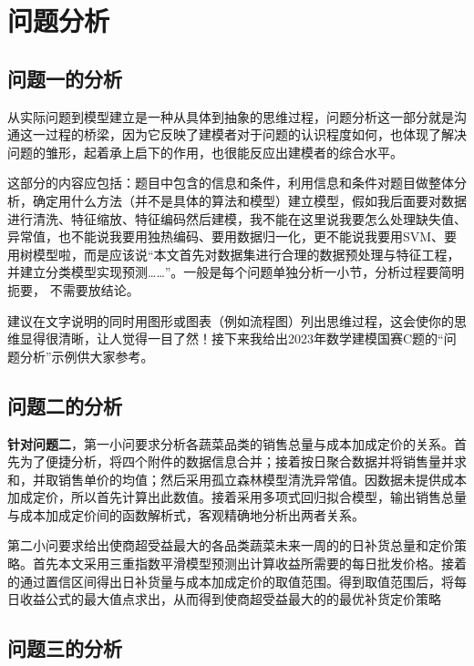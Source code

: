 \section{问题分析}

\subsection{问题一的分析}

从实际问题到模型建立是一种从具体到抽象的思维过程，问题分析这一部分就是沟通这一过程的桥梁，因为它反映了建模者对于问题的认识程度如何，也体现了解决问题的雏形，起着承上启下的作用，也很能反应出建模者的综合水平。

这部分的内容应包括：题目中包含的信息和条件，利用信息和条件对题目做整体分析，确定用什么方法（并不是具体的算法和模型）建立模型，假如我后面要对数据进行清洗、特征缩放、特征编码然后建模，我不能在这里说我要怎么处理缺失值、异常值，也不能说我要用独热编码、要用数据归一化，更不能说我要用SVM、要用树模型啦，而是应该说“本文首先对数据集进行合理的数据预处理与特征工程，并建立分类模型实现预测……”。一般是每个问题单独分析一小节，分析过程要简明扼要， 不需要放结论。

建议在文字说明的同时用图形或图表（例如流程图）列出思维过程，这会使你的思维显得很清晰，让人觉得一目了然！接下来我给出2023年数学建模国赛C题的“问题分析”示例供大家参考。




\subsection{问题二的分析}

\textbf{针对问题二}，第一小问要求分析各蔬菜品类的销售总量与成本加成定价的关系。首先为了便捷分析，将四个附件的数据信息合并；接着按日聚合数据并将销售量并求和，并取销售单价的均值；然后采用孤立森林模型清洗异常值。因数据未提供成本加成定价，所以首先计算出此数值。接着采用多项式回归拟合模型，输出销售总量与成本加成定价间的函数解析式，客观精确地分析出两者关系。

第二小问要求给出使商超受益最大的各品类蔬菜未来一周的的日补货总量和定价策略。首先本文采用三重指数平滑模型预测出计算收益所需要的每日批发价格。接着的通过置信区间得出日补货量与成本加成定价的取值范围。得到取值范围后，将每日收益公式的最大值点求出，从而得到使商超受益最大的的最优补货定价策略



\subsection{问题三的分析}

